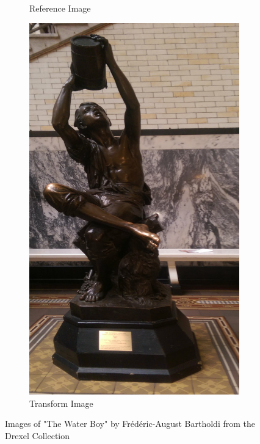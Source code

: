 \documentclass{article}
\begin{document}
\begin{figure}
\begin{subfigure}[b]{0.3\textwidth}
		\caption{Reference Image}
	\end{subfigure}
	\begin{subfigure}[b]{0.3\textwidth}
		\centering
		\includegraphics[width=\textwidth]{figures/alignment/waterboy_right}
		\caption{Transform Image}
	\end{subfigure}
	\caption{Images of "The Water Boy" by Frédéric-August Bartholdi from the Drexel Collection}
	\label{fig_waterboy_left_right}
\end{figure}
\end{document}
